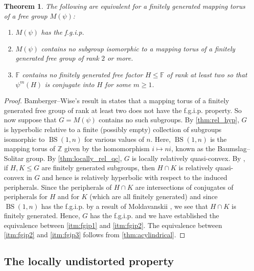 \documentclass[11pt, a4paper]{amsart}
\newtheorem{theorem}{Theorem}[section]
\theoremstyle{definition}
\newcommand{\F}{\mathbb{F}}
\newcommand{\Z}{\mathbb{Z}}
\DeclareMathOperator{\bs}{BS}
\begin{document}
\begin{theorem}
\label{fgip}
The following are equivalent for a finitely generated mapping torus of a free group $M(\psi)$:
\begin{enumerate}
\item\label{itm:fgip1} $M(\psi)$ has the f.g.i.p.
\item\label{itm:fgip2} $M(\psi)$ contains no subgroup isomorphic to a mapping torus of a finitely generated free group of rank $2$ or more.
\item\label{itm:fgip3} $\F$ contains no finitely generated free factor $H\leqslant \F$ of rank at least two so that $\psi^m(H)$ is conjugate into $H$ for some $m\geqslant 1$.
\end{enumerate}
\end{theorem}

\begin{proof}
Bamberger--Wise's result in \cite{BW22} states that a mapping torus of a finitely generated free group of rank at least two does not have the f.g.i.p. property. So now suppose that $G = M(\psi)$ contains no such subgroups. By \cref{thm:rel_hyp}, $G$ is hyperbolic relative to a finite (possibly empty) collection of subgroups isomorphic to $\bs(1, n)$ for various values of $n$. Here, $\bs(1, n)$ is the mapping torus of $\Z$ given by the homomorphism $i\mapsto ni$, known as the Baumslag--Solitar group. By \cref{thm:locally_rel_qc}, $G$ is locally relatively quasi-convex. By \cite[Theorem 1.2]{Hr10}, if $H, K\leqslant G$ are finitely generated subgroups, then $H\cap K$ is relatively quasi-convex in $G$ and hence is relatively hyperbolic with respect to the induced peripherals. Since the peripherals of $H\cap K$ are intersections of conjugates of peripherals for $H$ and for $K$ (which are all finitely generated) and since $\bs(1, n)$ has the f.g.i.p. by a result of Moldavanskii \cite{Mo68}, we see that $H\cap K$ is finitely generated. Hence, $G$ has the f.g.i.p. and we have established the equivalence between \eqref{itm:fgip1} and \eqref{itm:fgip2}. The equivalence between \eqref{itm:fgip2} and \eqref{itm:fgip3} follows from \cref{thm:acylindrical}.
\end{proof}



\subsection{The locally undistorted property}
\end{document}
